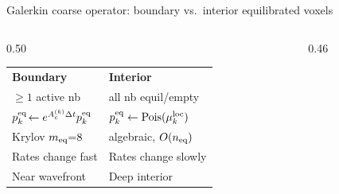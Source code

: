 \documentclass[10pt,aspectratio=169]{beamer}
\newcommand{\Pois}{\operatorname{Pois}}
\begin{document}
\begin{frame}{Galerkin coarse operator: boundary vs.\ interior equilibrated voxels}
\begin{columns}[T]
\begin{column}{0.50\textwidth}
    \medskip
    \begin{tabular}{@{}p{}p{}@{}}
      \textcolor{equilcolor!80!black}{\textbf{Boundary}} &
      \textcolor{equilcolor!50!black}{\textbf{Interior}} \\[0.2em]
      $\ge 1$ active nb & all nb equil/empty \\[0.2em]
      $p_k^{\rm eq} \!\leftarrow e^{A_c^{(k)}\Delta t}p_k^{\rm eq}$ &
      $p_k^{\rm eq} \leftarrow \Pois(\mu_k^{\rm loc})$ \\[0.2em]
      Krylov $m_{\rm eq}{=}8$ & algebraic, $O(n_{\rm eq})$ \\[0.2em]
      Rates change fast & Rates change slowly \\[0.2em]
      Near wavefront & Deep interior \\
    \end{tabular}
  \end{column}
  \begin{column}{0.46\textwidth}
    \begin{center}
\end{center}
\end{column}
\end{columns}
\end{frame}
\end{document}
